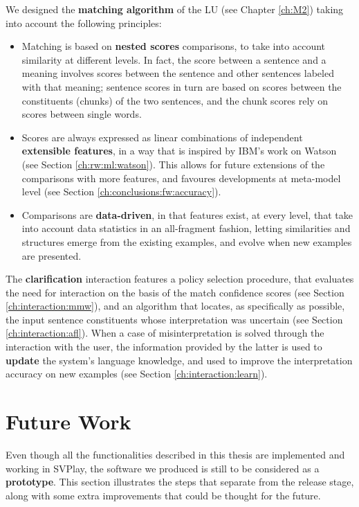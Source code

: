We designed the \textbf{matching algorithm} of the LU (see Chapter \ref{ch:M2}) taking into account the following principles:
\begin{itemize}
	\item Matching is based on \textbf{nested scores} comparisons, to take into account similarity at different levels. In fact, the score between a sentence and a meaning involves scores between the sentence and other sentences labeled with that meaning; sentence scores in turn are based on scores between the constituents (chunks) of the two sentences, and the chunk scores rely on scores between single words.
	\item Scores are always expressed as linear combinations of independent \textbf{extensible features}, in a way that is inspired by IBM's work on Watson (see Section \ref{ch:rw:ml:watson}). This allows for future extensions of the comparisons with more features, and favoures developments at meta-model level (see Section \ref{ch:conclusions:fw:accuracy}).
	\item Comparisons are \textbf{data-driven}, in that features exist, at every level, that take into account data statistics in an all-fragment fashion, letting similarities and structures emerge from the existing examples, and evolve when new examples are presented.
\end{itemize}

The \textbf{clarification} interaction features a policy selection procedure, that evaluates the need for interaction on the basis of the match confidence scores (see Section \ref{ch:interaction:mmw}), and an algorithm that locates, as specifically as possible, the input sentence constituents whose interpretation was uncertain (see Section \ref{ch:interaction:afl}). When a case of misinterpretation is solved through the interaction with the user, the information provided by the latter is used to \textbf{update} the system's language knowledge, and used to improve the interpretation accuracy on new examples (see Section \ref{ch:interaction:learn}).

\section{Future Work}
Even though all the functionalities described in this thesis are implemented and working in SVPlay, the software we produced is still to be considered as a \textbf{prototype}. This section illustrates the steps that separate \pname from the release stage, along with some extra improvements that could be thought for the future.

